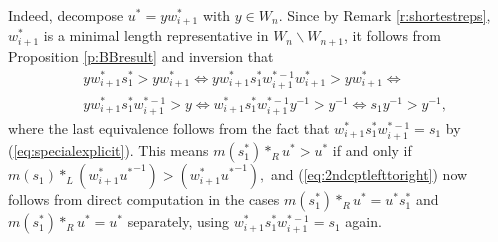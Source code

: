 \documentclass[12pt]{amsart}
\numberwithin{equation}{section}
\newcommand{\Wn}{{W}_n}
\newcommand{\cW}{{ W}}
\begin{document}
Indeed, decompose $u^{*}=yw_{i+1}^{*}$ with $y\in \Wn$.  Since by Remark \ref{r:shortestreps}, $w_{i+1}^{*}$ is a minimal 
length representative in $\Wn\backslash {\cW}_{n+1}$, it follows from Proposition \ref{p:BBresult} and inversion that
\begin{equation*}
\begin{split}
&yw_{i+1}^{*}s_{1}^{*}>yw_{i+1}^{*}\iff yw_{i+1}^{*}s_{1}^{*}{w_{i+1}^{*-1}} w_{i+1}^{*}>yw_{i+1}^{*}\iff  \\
&yw_{i+1}^{*}s_{1}^{*}{w_{i+1}^{*-1}}>y\iff w_{i+1}^{*}s_{1}^{*}{w_{i+1}^{*-1}}y^{-1}>y^{-1} \iff s_{1}y^{-1}>y^{-1}, 
\end{split}
\end{equation*}
where the last equivalence follows from the fact that $w_{i+1}^{*}s_{1}^{*}{w_{i+1}^{*-1}}=s_{1}$ by (\ref{eq:specialexplicit}).  This means $m(s_{1}^{*})*_{R} u^{*} > u^{*}$ if and only if $m(s_{1})*_{L} (w_{i+1}^{*} {u^{*}}^{-1}) > (w_{i+1}^{*} {u^{*}}^{-1}),$ and (\ref{eq:2ndcptlefttoright}) now follows from direct computation in the cases $m(s_{1}^{*})*_{R} u^{*}=u^{*}s_{1}^{*}$ and $m(s_{1}^{*})*_{R} u^{*}=u^{*}$ separately, using $w_{i+1}^{*}s_{1}^{*}{w_{i+1}^{*-1}}=s_{1}$ again.
\end{document}
